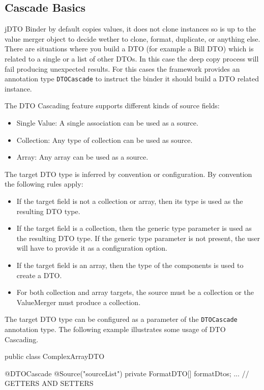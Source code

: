 \documentclass[11pt]{article}
\newcommand{\JDTO}{jDTO Binder\xspace}
\begin{document}
\subsection{Cascade Basics}

\JDTO by default copies values, it does not clone instances so is up to the value merger object to decide wether to clone, format, duplicate, or anything else. 
There are situations where you build a DTO (for example a Bill DTO) which is related to a single or a list of other DTOs. In this case the deep copy process will fail producing unexpected results. For this cases the framework provides an annotation type \texttt{DTOCascade} to instruct the binder it should build a DTO related instance.

The DTO Cascading feature supports different kinds of source fields:

\begin{itemize}
\item Single Value: A single association can be used as a source.
\item Collection: Any type of collection can be used as source.
\item Array: Any array can be used as a source. 
\end{itemize}


The target DTO type is inferred by convention or configuration. By convention the following rules apply:


\begin{itemize}
 \item If the target field is not a collection or array, then its type is used as the resulting DTO type.
 \item If the target field is a collection, then the generic type parameter is used as the resulting DTO type. If the generic type parameter is not present, the user will have to provide it as a configuration option.
 \item If the target field is an array, then the type of the components is used to create a DTO.
 \item For both collection and array targets, the source must be a collection or the ValueMerger must produce a collection.
\end{itemize}

The target DTO type can be configured as a parameter of the \texttt{DTOCascade} annotation type. The following example illustrates some usage of DTO Cascading.


\begin{java}
 public class ComplexArrayDTO {
    
    @DTOCascade
    @Source("sourceList")
    private FormatDTO[] formatDtos;
    ... // GETTERS AND SETTERS
}
\end{java}
\end{document}
